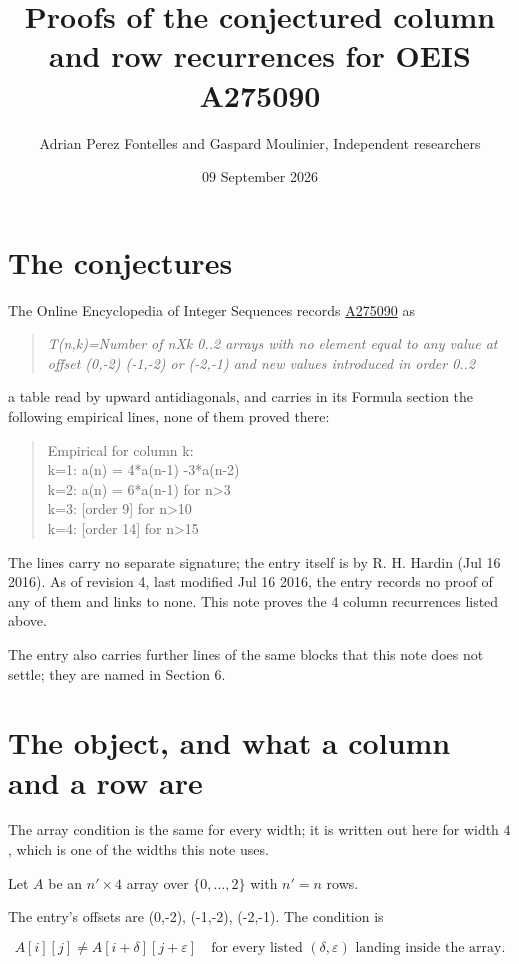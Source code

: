 \documentclass[11pt]{article}
\title{Proofs of the conjectured column and row recurrences for OEIS A275090}
\author{Adrian Perez Fontelles and Gaspard Moulinier, Independent researchers}
\date{09 September 2026}
\theoremstyle{definition}
\begin{document}
\maketitle
\section{The conjectures}

The Online Encyclopedia of Integer Sequences records \href{https://oeis.org/A275090}{A275090} as

\begin{quote}\itshape T(n,k)=Number of nXk 0..2 arrays with no element equal to any value at offset (0,-2) (-1,-2) or (-2,-1) and new values introduced in order 0..2\end{quote}

a table read by upward antidiagonals, and carries in its Formula section the following empirical lines, none of them proved there:

\begin{quote}\ttfamily Empirical for column k:\\
k=1: a(n) = 4*a(n-1) -3*a(n-2)\\k=2: a(n) = 6*a(n-1) for n>3\\k=3: [order 9] for n>10\\k=4: [order 14] for n>15\end{quote}

The lines carry no separate signature; the entry itself is by R. H. Hardin (Jul 16 2016). As of revision 4, last modified Jul 16 2016, the entry records no proof of any of them and links to none. This note proves the 4 column recurrences listed above.

The entry also carries further lines of the same blocks that this note does not settle; they are named in Section 6.

\section{The object, and what a column and a row are}

The array condition is the same for every width; it is written out here for width $4$, which is one of the widths this note uses.

Let $A$ be an $n' \times 4$ array over $\{0,\dots,2\}$ with $n' = n$ rows.

The entry's offsets are (0,-2), (-1,-2), (-2,-1). The condition is

\[A[i][j] \ne A[i{+}\delta][j{+}\varepsilon]\quad\text{for every listed }(\delta,\varepsilon)\text{ landing inside the array.}\]
\end{document}
